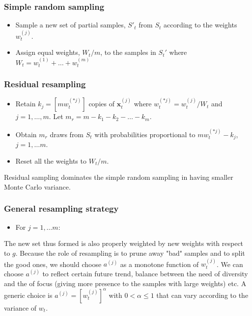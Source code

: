 \documentclass[times, utf8, diplomski]{fer}
\begin{document}
\subsubsection{Simple random sampling}
\begin{itemize}
\item{Sample a new set of partial samples, $S'_t$ from $S_t$ according to the weights $w_t^{(j)}$.}
\item{Assign equal weights, $W_t / m$, to the samples in $S_t'$ where $W_t = w_t^{(1)} + \ldots + w_t^{(m)}$}
\end{itemize}

\subsubsection{Residual resampling}
\begin{itemize}
\item{Retain $k_j = [mw_t^{(*j)}]$ copies of $\mathbf{x}_t^{(j)}$ where $w_t^{(*j)} = w_t^{(j)} / W_t$ and $j = 1, \ldots, m$. Let $m_r = m - k_1 - k_2 - \ldots - k_m$.}
\item{Obtain $m_r$ draws from $S_t$ with probabilities proportional to $mw_t^{(*j)} - k_j$, $j = 1, \ldots m$.}
\item{Reset all the weights to $W_t / m$.}
\end{itemize}

Residual sampling dominates the simple random sampling in having smaller Monte Carlo variance. 

\subsubsection{General resampling strategy}
\begin{itemize}
\item{For $j = 1, \ldots m$:
}
\end{itemize}
The new set thus formed is also properly weighted by new weights with respect to $g$. Because the role of resampling is to prune away "bad" samples and to split the good ones, we should choose $a^{(j)}$ as a monotone function of $w_t^{(j)}$. We can choose $a^{(j)}$ to reflect certain future trend, balance between the need of diversity and the of focus (giving more presence to the samples with large weights) etc.  A generic choice is $a^{(j)} = [w_t^{(j)}]^{\alpha}$ with $0 < \alpha \leq 1$ that can vary according to the variance of $w_t$.
\end{document}
